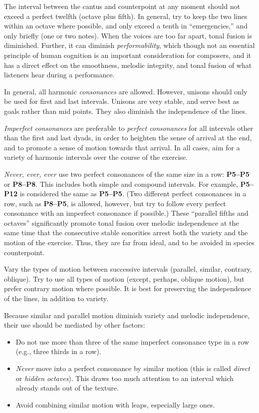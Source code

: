 \documentclass{book}
\providecommand{\tightlist}{%
  \setlength{\itemsep}{0pt}\setlength{\parskip}{0pt}}
\begin{document}
The interval between the cantus and counterpoint at any moment should not
exceed a perfect twelfth (octave plus fifth). In general, try to keep the two
lines within an octave where possible, and only exceed a tenth in
``emergencies,'' and only briefly (one or two notes). When the voices are too
far apart, tonal fusion is diminished. Further, it can diminish
\emph{performability}, which though not an essential principle of human
cognition is an important consideration for composers, and it has a direct
effect on the smoothness, melodic integrity, and tonal fusion of what
listeners hear during a performance.

In general, all harmonic \emph{consonances} are allowed. However, unisons
should only be used for first and last intervals. Unisons are very stable, and
serve best as goals rather than mid points. They also diminish the
independence of the lines.

\emph{Imperfect consonances} are preferable to \emph{perfect consonances} for
all intervals other than the first and last dyads, in order to heighten the
sense of arrival at the end, and to promote a sense of motion towards that
arrival. In all cases, aim for a variety of harmonic intervals over the course
of the exercise.

\emph{Never, ever, ever} use two perfect consonances of the same size in a
row: \textbf{P5--P5} or \textbf{P8--P8}. This includes both simple and
compound intervals. For example, \textbf{P5--P12} is considered the same as
\textbf{P5--P5}. (Two different perfect consonances in a row, such as
\textbf{P8--P5}, is allowed, however, but try to follow every perfect
consonance with an imperfect consonance if possible.) These ``parallel fifths
and octaves'' significantly promote tonal fusion over melodic independence at
the same time that the consecutive stable sonorities arrest both the variety
and the motion of the exercise. Thus, they are far from ideal, and to be
avoided in species counterpoint.

Vary the types of motion between successive intervals (parallel, similar,
contrary, oblique). Try to use all types of motion (except, perhaps, oblique
motion), but prefer contrary motion where possible. It is best for preserving
the independence of the lines, in addition to variety.

Because similar and parallel motion diminish variety and melodic independence,
their use should be mediated by other factors:

\begin{itemize}
\tightlist
\item
  Do not use more than three of the same imperfect consonance type in a row
  (e.g., three thirds in a row).\\
\item
  \emph{Never} move into a perfect consonance by similar motion (this is
  called \emph{direct} or \emph{hidden octaves}). This draws too much
  attention to an interval which already stands out of the texture.\\
\item
  Avoid combining similar motion with leaps, especially large ones.
\end{itemize}
\end{document}
